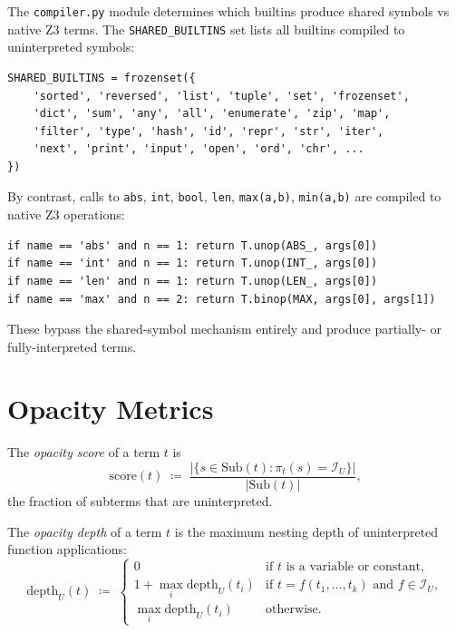 The \texttt{compiler.py} module determines which builtins produce
shared symbols vs native Z3 terms.  The \texttt{SHARED\_BUILTINS}
set lists all builtins compiled to uninterpreted symbols:

\begin{lstlisting}[caption={Shared builtins (compiler.py)}]
SHARED_BUILTINS = frozenset({
    'sorted', 'reversed', 'list', 'tuple', 'set', 'frozenset',
    'dict', 'sum', 'any', 'all', 'enumerate', 'zip', 'map',
    'filter', 'type', 'hash', 'id', 'repr', 'str', 'iter',
    'next', 'print', 'input', 'open', 'ord', 'chr', ...
})
\end{lstlisting}

By contrast, calls to \texttt{abs}, \texttt{int}, \texttt{bool},
\texttt{len}, \texttt{max(a,b)}, \texttt{min(a,b)} are compiled
to native Z3 operations:

\begin{lstlisting}[caption={Native compilation (compiler.py)}]
if name == 'abs' and n == 1: return T.unop(ABS_, args[0])
if name == 'int' and n == 1: return T.unop(INT_, args[0])
if name == 'len' and n == 1: return T.unop(LEN_, args[0])
if name == 'max' and n == 2: return T.binop(MAX, args[0], args[1])
\end{lstlisting}

These bypass the shared-symbol mechanism entirely and produce
partially- or fully-interpreted terms.


\section{Opacity Metrics}
\label{sec:opacity-metrics}

\begin{definition}
\label{def:opacity-score}
The \emph{opacity score} of a term $t$ is
\[
  \mathrm{score}(t) \;\coloneqq\;
  \frac{|\{s \in \mathrm{Sub}(t) : \pi_t(s) = \mathcal{I}_U\}|}
       {|\mathrm{Sub}(t)|},
\]
the fraction of subterms that are uninterpreted.
\end{definition}

\begin{definition}
\label{def:opacity-depth}
The \emph{opacity depth} of a term $t$ is the maximum nesting
depth of uninterpreted function applications:
\[
  \mathrm{depth}_U(t) \;\coloneqq\;
  \begin{cases}
    0 & \text{if } t \text{ is a variable or constant,} \\
    1 + \max_i \mathrm{depth}_U(t_i)
      & \text{if } t = f(t_1,\ldots,t_k)
        \text{ and } f \in \mathcal{I}_U, \\
    \max_i \mathrm{depth}_U(t_i)
      & \text{otherwise.}
  \end{cases}
\]
\end{definition}

